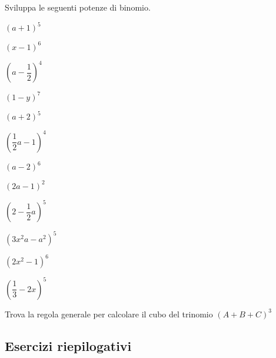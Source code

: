 \begin{esercizio}
 \label{ese:11.29}
 Sviluppa le seguenti potenze di binomio.
 \begin{multicols}{4}
 \begin{enumeratea}
 \spazielenx
\item $\left(a+1\right)^{5}$
\item $\left(x-1\right)^{6}$
\item $\left(a-\dfrac{1}{2}\right)^{4}$
\item $\left(1-y\right)^{7}$
\item $\left(a+2\right)^{5}$
\item $\left(\dfrac{1}{2}a-1\right)^{4}$
\item $\left(a-2\right)^{6}$
\item $\left(2a-1\right)^{2}$
\item $\left(2-\dfrac{1}{2}a\right)^{5}$
\item $\left(3x^{2}a-a^{2}\right)^{5}$
\item $\left(2x^{2}-1\right)^{6}$
\item $\left(\dfrac{1}{3}-2x\right)^{5}$
\end{enumeratea}
 \end{multicols}
\end{esercizio}

\begin{esercizio}
 \label{ese:11.30}
 Trova la regola generale per calcolare il cubo del trinomio
$(A+B+C)^{3}$
\end{esercizio}


\subsection{Esercizi riepilogativi}

